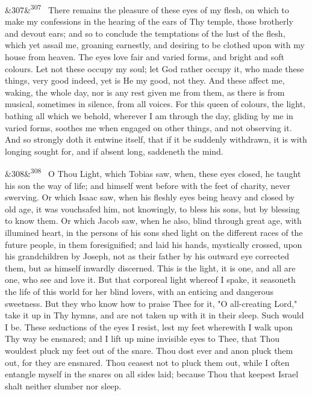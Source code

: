 \documentclass[12pt]{article}
\newcommand{\para}[1][]{\par\noindent\ifx&#1&\else\textsuperscript{\footnotesize #1}~\fi}
\begin{document}
\para[307] There remains the pleasure of these eyes of my flesh, on which to make my confessions in the hearing of the ears of Thy temple, those brotherly and devout ears; and so to conclude the temptations of the lust of the flesh, which yet assail me, groaning earnestly, and desiring to be clothed upon with my house from heaven. The eyes love fair and varied forms, and bright and soft colours. Let not these occupy my soul; let God rather occupy it, who made these things, very good indeed, yet is He my good, not they. And these affect me, waking, the whole day, nor is any rest given me from them, as there is from musical, sometimes in silence, from all voices. For this queen of colours, the light, bathing all which we behold, wherever I am through the day, gliding by me in varied forms, soothes me when engaged on other things, and not observing it. And so strongly doth it entwine itself, that if it be suddenly withdrawn, it is with longing sought for, and if absent long, saddeneth the mind.

\para[308] O Thou Light, which Tobias saw, when, these eyes closed, he taught his son the way of life; and himself went before with the feet of charity, never swerving. Or which Isaac saw, when his fleshly eyes being heavy and closed by old age, it was vouchsafed him, not knowingly, to bless his sons, but by blessing to know them. Or which Jacob saw, when he also, blind through great age, with illumined heart, in the persons of his sons shed light on the different races of the future people, in them foresignified; and laid his hands, mystically crossed, upon his grandchildren by Joseph, not as their father by his outward eye corrected them, but as himself inwardly discerned. This is the light, it is one, and all are one, who see and love it. But that corporeal light whereof I spake, it seasoneth the life of this world for her blind lovers, with an enticing and dangerous sweetness. But they who know how to praise Thee for it, "O all-creating Lord," take it up in Thy hymns, and are not taken up with it in their sleep. Such would I be. These seductions of the eyes I resist, lest my feet wherewith I walk upon Thy way be ensnared; and I lift up mine invisible eyes to Thee, that Thou wouldest pluck my feet out of the snare. Thou dost ever and anon pluck them out, for they are ensnared. Thou ceasest not to pluck them out, while I often entangle myself in the snares on all sides laid; because Thou that keepest Israel shalt neither slumber nor sleep.
\end{document}
